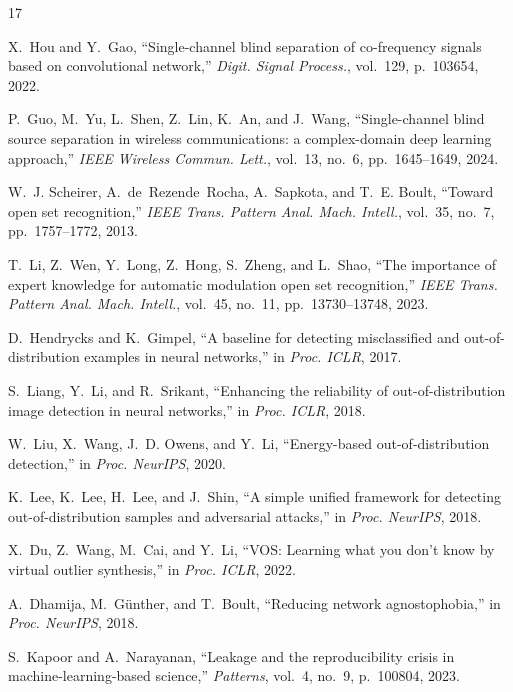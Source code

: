 \documentclass[journal,letterpaper]{IEEEtran}
\begin{document}
\begin{thebibliography}{17}\footnotesize

X.~Hou and Y.~Gao,
``Single-channel blind separation of co-frequency signals based on
convolutional network,''
\emph{Digit. Signal Process.}, vol.~129, p.~103654, 2022.

P.~Guo, M.~Yu, L.~Shen, Z.~Lin, K.~An, and J.~Wang,
``Single-channel blind source separation in wireless communications: a
complex-domain deep learning approach,''
\emph{IEEE Wireless Commun. Lett.}, vol.~13, no.~6, pp.~1645--1649,
2024.

W.~J. Scheirer, A.~de~Rezende~Rocha, A.~Sapkota, and T.~E. Boult,
``Toward open set recognition,''
\emph{IEEE Trans. Pattern Anal. Mach. Intell.}, vol.~35, no.~7,
pp.~1757--1772, 2013.

T.~Li, Z.~Wen, Y.~Long, Z.~Hong, S.~Zheng, and L.~Shao,
``The importance of expert knowledge for automatic modulation open set
recognition,''
\emph{IEEE Trans. Pattern Anal. Mach. Intell.}, vol.~45, no.~11,
pp.~13730--13748, 2023.

D.~Hendrycks and K.~Gimpel,
``A baseline for detecting misclassified and out-of-distribution
examples in neural networks,''
in \emph{Proc. ICLR}, 2017.

S.~Liang, Y.~Li, and R.~Srikant,
``Enhancing the reliability of out-of-distribution image detection in
neural networks,''
in \emph{Proc. ICLR}, 2018.

W.~Liu, X.~Wang, J.~D. Owens, and Y.~Li,
``Energy-based out-of-distribution detection,''
in \emph{Proc. NeurIPS}, 2020.

K.~Lee, K.~Lee, H.~Lee, and J.~Shin,
``A simple unified framework for detecting out-of-distribution samples
and adversarial attacks,''
in \emph{Proc. NeurIPS}, 2018.

X.~Du, Z.~Wang, M.~Cai, and Y.~Li,
``VOS: Learning what you don't know by virtual outlier synthesis,''
in \emph{Proc. ICLR}, 2022.

A.~Dhamija, M.~G{\"u}nther, and T.~Boult,
``Reducing network agnostophobia,''
in \emph{Proc. NeurIPS}, 2018.

S.~Kapoor and A.~Narayanan,
``Leakage and the reproducibility crisis in machine-learning-based
science,''
\emph{Patterns}, vol.~4, no.~9, p.~100804, 2023.


\end{thebibliography}
\end{document}
